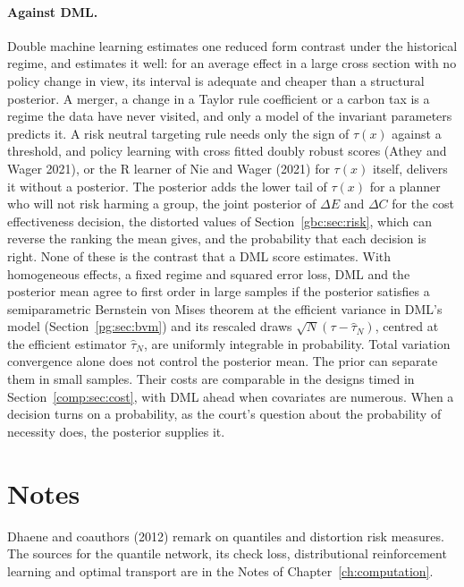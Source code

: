 \paragraph{Against DML.} Double machine learning estimates one reduced form contrast under the historical regime, and estimates it well: for an average effect in a large cross section with no policy change in view, its interval is adequate and cheaper than a structural posterior. A merger, a change in a Taylor rule coefficient or a carbon tax is a regime the data have never visited, and only a model of the invariant parameters predicts it. A risk neutral targeting rule needs only the sign of $\tau(x)$ against a threshold, and policy learning with cross fitted doubly robust scores (Athey and Wager 2021), or the R learner of Nie and Wager (2021) for $\tau(x)$ itself, delivers it without a posterior. The posterior adds the lower tail of $\tau(x)$ for a planner who will not risk harming a group, the joint posterior of $\Delta E$ and $\Delta C$ for the cost effectiveness decision, the distorted values of Section~\ref{gbc:sec:risk}, which can reverse the ranking the mean gives, and the probability that each decision is right. None of these is the contrast that a DML score estimates. With homogeneous effects, a fixed regime and squared error loss, DML and the posterior mean agree to first order in large samples if the posterior satisfies a semiparametric Bernstein von Mises theorem at the efficient variance in DML's model (Section~\ref{pg:sec:bvm}) and its rescaled draws $\sqrt N(\tau-\hat\tau_N)$, centred at the efficient estimator $\hat\tau_N$, are uniformly integrable in probability. Total variation convergence alone does not control the posterior mean. The prior can separate them in small samples. Their costs are comparable in the designs timed in Section~\ref{comp:sec:cost}, with DML ahead when covariates are numerous. When a decision turns on a probability, as the court's question about the probability of necessity does, the posterior supplies it.

\section*{Notes}



Dhaene and coauthors (2012) remark on quantiles and distortion risk measures. The sources for the quantile network, its check loss, distributional reinforcement learning and optimal transport are in the Notes of Chapter~\ref{ch:computation}.

